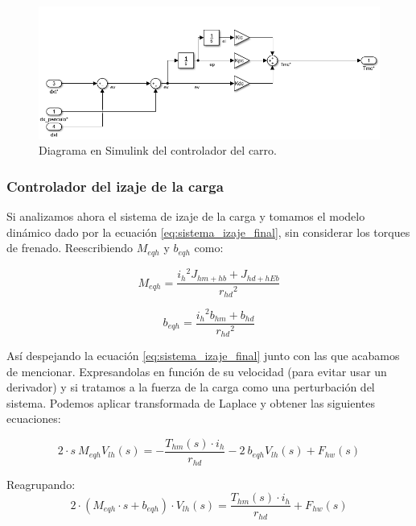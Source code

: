 \documentclass[11pt]{article}
\begin{document}
\begin{figure}[h!]
	\centering
	\includegraphics[width=1\textwidth]{images/imagen_12_controlador_carro.png}
	\caption{Diagrama en Simulink del controlador del carro.}
	\label{fig:controlador_carro_simulink}
\end{figure}


\subsubsection{Controlador del izaje de la carga}

Si analizamos ahora el sistema de izaje de la carga y tomamos el modelo dinámico dado por la ecuación \ref{eq:sistema_izaje_final}, sin considerar los torques de frenado. Reescribiendo $M_{eqh}$ y $b_{eqh}$ como:

\begin{equation}
	\label{eq:sistema_izaje_masa_equivalente}
	M_{eqh} = \frac{{i_{h}}^{2}J_{hm+hb}+J_{hd+hEb}}{{r_{hd}}^{2}}
\end{equation}

\begin{equation}
	\label{eq:sistema_izaje_friccion_equivalente}
	b_{eqh} = \frac{{i_{h}}^{2}b_{hm}+b_{hd}}{{r_{hd}}^{2}}
\end{equation}

Así despejando la ecuación \ref{eq:sistema_izaje_final} junto con las que acabamos de mencionar. Expresandolas en función de su velocidad (para evitar usar un derivador) y si tratamos a la fuerza de la carga como una perturbación del sistema. Podemos aplicar transformada de Laplace y obtener las siguientes ecuaciones:

\begin{equation}
	\label{eq:sistema_izaje_simplificado_laplace}
	2\cdot s\ M_{eqh} V_{lh}(s)=-\frac{ T_{hm}(s)\cdot i_{h}}{r_{hd}}-2\ b_{eqh} V_{lh}(s)+F_{hw}(s)
\end{equation}

Reagrupando:
\begin{equation}
	\label{eq:sistema_izaje_simplificado_laplace_reordenado}
	2\cdot \left ( M_{eqh}\cdot s+b_{eqh} \right )\cdot V_{lh}(s) = \frac{T_{hm}(s)\cdot i_{h}}{r_{hd}}+ F_{hw}(s)
\end{equation}
\end{document}
